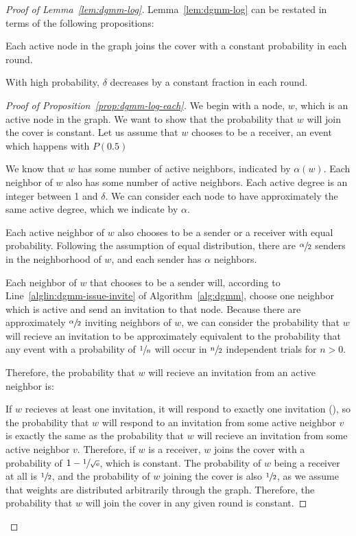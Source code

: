 \begin{proof}[Proof of Lemma~\ref{lem:dgmm-log}]


Lemma~\ref{lem:dgmm-log} can be restated in terms of the following propositions:
\begin{lprp}
\label{prop:dgmm-log-each}
Each active node in the graph joins the cover with a constant probability in each round.
\end{lprp}
\begin{lprp}
\label{prop:dgmm-log-alpha}
With high probability, $\delta$ decreases by a constant fraction in each round.
\end{lprp}
\begin{proof}[Proof of Proposition~\ref{prop:dgmm-log-each}]

We begin with a node, $w$, which is an active node in the graph. We want to show that the probability that $w$ will join the cover is constant. Let us assume that $w$ chooses to be a receiver, an event which happens with $P(0.5)$

We know that $w$ has some number of active neighbors, indicated by $\alpha(w)$. Each neighbor of $w$ also has some number of active neighbors. Each active degree is an integer between 1 and $\delta$. We can consider each node to have approximately the same active degree, which we indicate by $\alpha$. 

Each active neighbor of $w$ also chooses to be a sender or a receiver with equal probability. Following the assumption of equal distribution, there are $\sfrac{\alpha}{2}$ senders in the neighborhood of $w$, and each sender has $\alpha$ neighbors.

Each neighbor of $w$ that chooses to be a sender will, according to Line~\ref{alglin:dgmm-issue-invite} of Algorithm~\ref{alg:dgmm}, choose one neighbor which is active and send an invitation to that node. Because there are approximately $\sfrac{\alpha}{2}$ inviting neighbors of $w$, we can consider the probability that $w$ will recieve an invitation to be approximately equivalent to the probability that any event with a probability of $\sfrac{1}{n}$ will occur in $\sfrac{n}{2}$ independent trials for $n > 0$. 

Therefore, the probability that $w$ will recieve an invitation from an active neighbor is: 

If $w$ recieves at least one invitation, it will respond to exactly one invitation (), so the probability that $w$ will respond to an invitation from some active neighbor $v$ is exactly the same as the probability that $w$ will recieve an invitation from some active neighbor $v$. Therefore, if $w$ is a receiver, $w$ joins the cover with a probability of $1 - \sfrac{1}{\sqrt{{\mathrm{e}}}}$, which is constant. The probability of $w$ being a receiver at all is $\sfrac{1}{2}$, and the probability of $w$ joining the cover is also $\sfrac{1}{2}$, as we assume that weights are distributed arbitrarily through the graph. Therefore, the probability that $w$ will join the cover in any given round is constant.
\end{proof}


\end{proof}
